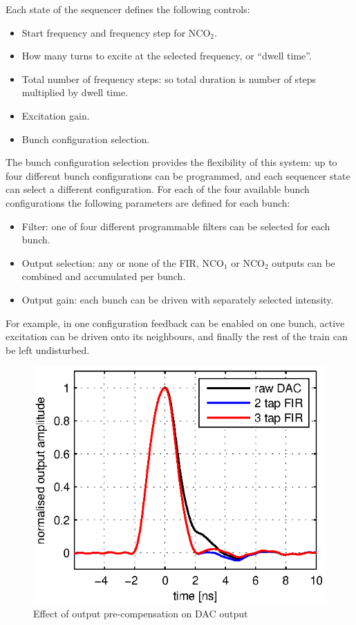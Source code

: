 \documentclass{JAC2003}
\newcommand{\textsubscript}[1]{$_{\text{#1}}$}
\newcommand{\NCO}[1]{NCO\textsubscript{#1}}
\begin{document}
Each state of the sequencer defines the following controls:

\begin{itemize}
\item Start frequency and frequency step for \NCO2.
\item How many turns to excite at the selected frequency, or ``dwell time''.
\item Total number of frequency steps: so total duration is number of steps
multiplied by dwell time.
\item Excitation gain.
\item Bunch configuration selection.
\end{itemize}

The bunch configuration selection provides the flexibility of this system: up to
four different bunch configurations can be programmed, and each sequencer state
can select a different configuration.  For each of the four available bunch
configurations the following parameters are defined for each bunch:

\begin{itemize}
\item Filter: one of four different programmable filters can be selected for
each bunch.
\item Output selection: any or none of the FIR, \NCO1 or \NCO2 outputs can be
combined and accumulated per bunch.
\item Output gain: each bunch can be driven with separately selected intensity.
\end{itemize}

For example, in one configuration feedback can be enabled on one bunch, active
excitation can be driven onto its neighbours, and finally the rest of the train
can be left undisturbed.



\begin{figure}[h]
\centering
\includegraphics{WEPC10f2}
\caption{Effect of output pre-compensation on DAC output}
\label{precomp}
\end{figure}
\end{document}

